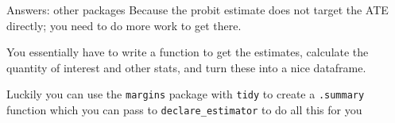 \documentclass[
  11pt,
  ignorenonframetext,
]{beamer}
\newenvironment{Shaded}{\begin{snugshade}}{\end{snugshade}}
\newcommand{\AttributeTok}[1]{\textcolor[rgb]{0.40,0.45,0.13}{#1}}
\newcommand{\ConstantTok}[1]{\textcolor[rgb]{0.56,0.35,0.01}{#1}}
\newcommand{\ControlFlowTok}[1]{\textcolor[rgb]{0.00,0.23,0.31}{#1}}
\newcommand{\FunctionTok}[1]{\textcolor[rgb]{0.28,0.35,0.67}{#1}}
\newcommand{\NormalTok}[1]{\textcolor[rgb]{0.00,0.23,0.31}{#1}}
\newcommand{\OtherTok}[1]{\textcolor[rgb]{0.00,0.23,0.31}{#1}}
\newcommand{\SpecialCharTok}[1]{\textcolor[rgb]{0.37,0.37,0.37}{#1}}
\newcommand{\StringTok}[1]{\textcolor[rgb]{0.13,0.47,0.30}{#1}}
\begin{document}
\begin{frame}[fragile]{Answers: other packages}
\protect\hypertarget{answers-other-packages-2}{}
Because the probit estimate does not target the ATE directly; you need
to do more work to get there.

You essentially have to write a function to get the estimates, calculate
the quantity of interest and other stats, and turn these into a nice
dataframe.

Luckily you can use the \texttt{margins} package with \texttt{tidy} to
create a \texttt{.summary} function which you can pass to
\texttt{declare\_estimator} to do all this for you

\begin{Shaded}
\end{Shaded}
\end{frame}
\end{document}
